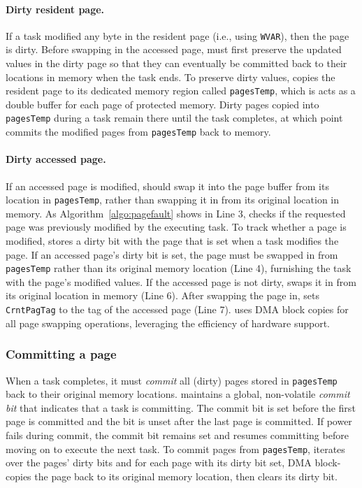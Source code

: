 \paragraph{Dirty resident page.} If a task modified any byte in the resident
page (i.e.,  using \texttt{WVAR}), then the page is dirty. Before swapping in
the accessed page, \sys must first preserve the updated values in the dirty
page so that they can eventually be committed back to their locations in memory
when the task ends.  To preserve dirty values, \sys copies the resident page to
its dedicated memory region called \texttt{pagesTemp}, which is acts as a double buffer
for each page of protected memory.  Dirty pages copied into {\tt pagesTemp}
during a task remain there until the task completes, at which point \sys
commits the modified pages from {\tt pagesTemp} back to memory.  

\paragraph{Dirty accessed page.} If an accessed page is modified, \sys should
swap it into the page buffer from its location in {\tt pagesTemp}, rather than
swapping it in from its original location in memory. 
%
As Algorithm~\ref{algo:pagefault} shows in Line 3, \sys checks if the requested
page was previously modified by the executing task. To track whether a page is
modified, \sys stores a dirty bit with the page that is set when a task
modifies the page.  If an accessed page's dirty bit is set, the page must be
swapped in from \texttt{pagesTemp} rather than its original memory location
(Line 4), furnishing the task with the page's modified values. If the accessed
page is not dirty, \sys swaps it in from its original location in memory (Line
6). After swapping the page in, \sys sets \texttt{CrntPagTag} to the tag of the
accessed page (Line 7). \sys uses DMA block copies for all page swapping
operations, leveraging the efficiency of hardware support.

\subsubsection{Committing a page}

When a task completes, it must {\em commit} all (dirty) pages stored in
\texttt{pagesTemp} back to their original memory locations. \sys maintains a
global, non-volatile {\em commit bit} that indicates that a task is committing.  The
commit bit is set before the first page is committed and the bit is unset after the
last page is committed.  If power fails during commit, the commit bit remains set and
\sys resumes committing before moving on to execute the next task.  To commit
pages from {\tt pagesTemp}, \sys iterates over the pages' dirty bits and for
each page with its dirty bit set, \sys DMA block-copies the page back to its
original memory location, then clears its dirty bit.

